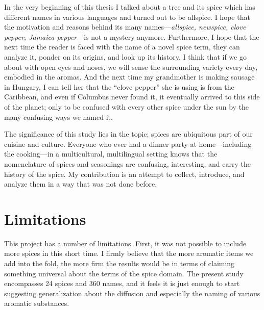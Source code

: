 In the very beginning of this thesis I talked about a tree and its spice which has different names in various languages and turned out to be allspice. I hope that the motivation and reasons behind its many names---\textit{allspice, newspice, clove pepper, Jamaica pepper}---is not a mystery anymore. Furthermore, I hope that the next time the reader is faced with the name of a novel spice term, they can analyze it, ponder on its origins, and look up its history. I think that if we go about with open eyes and noses, we will sense the surrounding variety every day, embodied in the aromas. And the next time my grandmother is making sausage in Hungary, I can tell her that the ``clove pepper'' she is using is from the Caribbean, and even if Columbus never found it, it eventually arrived to this side of the planet; only to be confused with every other spice under the sun by the many confusing ways we named it.

The significance of this study lies in the topic; spices are ubiquitous part of our cuisine and culture. Everyone who ever had a dinner party at home---including the cooking---in a multicultural, multilingual setting knows that the nomenclature of spices and seasonings are confusing, interesting, and carry the history of the spice. My contribution is an attempt to collect, introduce, and analyze them in a way that was not done before. 


\section{Limitations}
\label{sec:limitations}


This project has a number of limitations. First, it was not possible to include more spices in this short time. I firmly believe that the more aromatic items we add into the fold, the more firm the results would be in terms of claiming something universal about the terms of the spice domain. The present study encompasses 24 spices and 360 names, and it feels it is just enough to start suggesting generalization about the diffusion and especially the naming of various aromatic substances.

